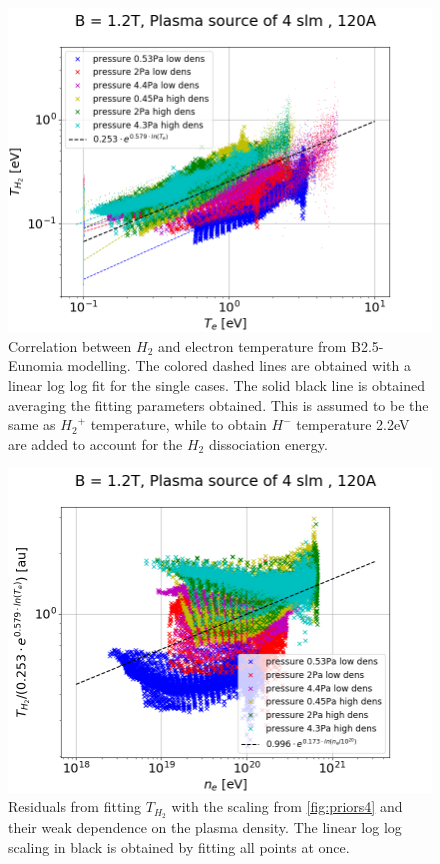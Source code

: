 \begin{figure}
	\centering
	\includegraphics[width=0.7\linewidth,trim={0 0 30 45},clip]{Chapters/chapter3/figs/TH2_Te3.png}
	\caption{Correlation between $H_2$ and electron temperature from B2.5-Eunomia modelling. The colored dashed lines are obtained with a linear log log fit for the single cases. The solid black line is obtained averaging the fitting parameters obtained. This is assumed to be the same as ${H_2}^+$ temperature, while to obtain $H^-$ temperature 2.2eV are added to account for the $H_2$ dissociation energy.}
	\label{fig:priors4}
\end{figure}

\begin{figure}
	\centering
	\includegraphics[width=0.7\linewidth,trim={0 0 30 45},clip]{Chapters/chapter3/figs/TH2_Te_ne3.png}
	\caption{Residuals from fitting $T_{H_2}$ with the scaling from \autoref{fig:priors4} and their weak dependence on the plasma density. The linear log log scaling in black is obtained by fitting all points at once.}
	\label{fig:priors4b}
\end{figure}

